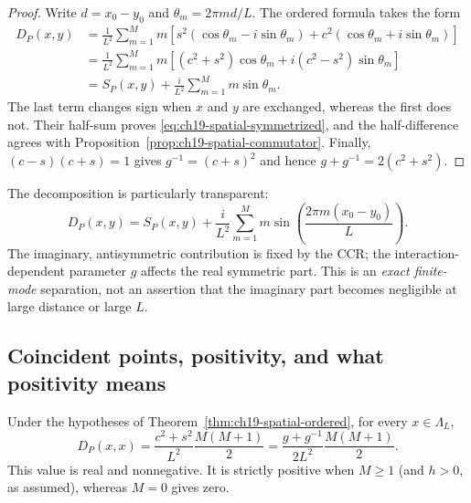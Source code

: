 \begin{proof}
Write $d=x_0-y_0$ and $\theta_m=2\pi md/L$.
The ordered formula takes the form
\begin{align*}
 D_P(x,y)
 &=\frac1{L^2}\sum_{m=1}^{M}m
   \left[s^2(\cos\theta_m-i\sin\theta_m)
        +c^2(\cos\theta_m+i\sin\theta_m)\right]\\
 &=\frac1{L^2}\sum_{m=1}^{M}m
   \left[(c^2+s^2)\cos\theta_m+i(c^2-s^2)\sin\theta_m\right]\\
 &=S_P(x,y)+\frac{i}{L^2}\sum_{m=1}^{M}m\sin\theta_m.
\end{align*}
The last term changes sign when $x$ and $y$ are exchanged,
whereas the first does not.  Their half-sum proves
\eqref{eq:ch19-spatial-symmetrized}, and the half-difference
agrees with Proposition~\ref{prop:ch19-spatial-commutator}.
Finally, $(c-s)(c+s)=1$ gives
$g^{-1}=(c+s)^2$ and hence
$g+g^{-1}=2(c^2+s^2)$.
\end{proof}

The decomposition is particularly transparent:
\begin{equation}
 \boxed{\displaystyle
 D_P(x,y)=S_P(x,y)
  +\frac{i}{L^2}\sum_{m=1}^{M}m
    \sin\!\left(\frac{2\pi m(x_0-y_0)}L\right).}
 \label{eq:ch19-spatial-ordered-realimag}
\end{equation}
The imaginary, antisymmetric contribution is fixed by the CCR; the
interaction-dependent parameter $g$ affects the real symmetric part.
This is an \emph{exact finite-mode} separation, not an assertion that
the imaginary part becomes negligible at large distance or large $L$.

\subsection{Coincident points, positivity, and what positivity means}

\begin{theorem}
\label{thm:ch19-spatial-diagonal}
Under the hypotheses of Theorem~\ref{thm:ch19-spatial-ordered},
for every $x\in\Lambda_L$,
\begin{equation}
 \boxed{\displaystyle
 D_P(x,x)=\frac{c^2+s^2}{L^2}\frac{M(M+1)}2
           =\frac{g+g^{-1}}{2L^2}\frac{M(M+1)}2.}
 \label{eq:ch19-spatial-diagonal}
\end{equation}
This value is real and nonnegative.  It is strictly positive when
$M\geq1$ (and $h>0$, as assumed), whereas $M=0$ gives zero.
\end{theorem}

